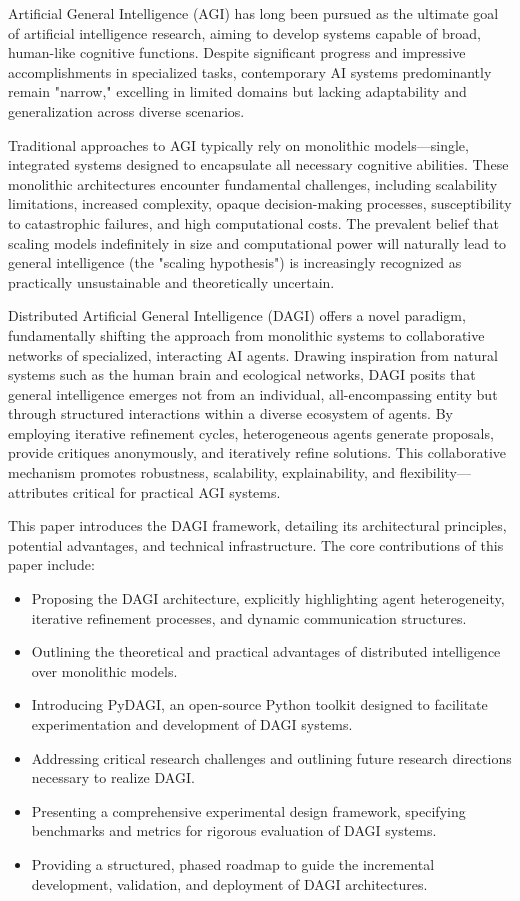\documentclass[12pt]{amsart}
\begin{document}
Artificial General Intelligence (AGI) has long been pursued as the ultimate goal of artificial intelligence research, aiming to develop systems capable of broad, human-like cognitive functions. Despite significant progress and impressive accomplishments in specialized tasks, contemporary AI systems predominantly remain "narrow," excelling in limited domains but lacking adaptability and generalization across diverse scenarios.

Traditional approaches to AGI typically rely on monolithic models—single, integrated systems designed to encapsulate all necessary cognitive abilities. These monolithic architectures encounter fundamental challenges, including scalability limitations, increased complexity, opaque decision-making processes, susceptibility to catastrophic failures, and high computational costs. The prevalent belief that scaling models indefinitely in size and computational power will naturally lead to general intelligence (the "scaling hypothesis") is increasingly recognized as practically unsustainable and theoretically uncertain.

Distributed Artificial General Intelligence (DAGI) offers a novel paradigm, fundamentally shifting the approach from monolithic systems to collaborative networks of specialized, interacting AI agents. Drawing inspiration from natural systems such as the human brain and ecological networks, DAGI posits that general intelligence emerges not from an individual, all-encompassing entity but through structured interactions within a diverse ecosystem of agents. By employing iterative refinement cycles, heterogeneous agents generate proposals, provide critiques anonymously, and iteratively refine solutions. This collaborative mechanism promotes robustness, scalability, explainability, and flexibility—attributes critical for practical AGI systems.

This paper introduces the DAGI framework, detailing its architectural principles, potential advantages, and technical infrastructure. The core contributions of this paper include:
\begin{itemize}
    \item Proposing the DAGI architecture, explicitly highlighting agent heterogeneity, iterative refinement processes, and dynamic communication structures.
    \item Outlining the theoretical and practical advantages of distributed intelligence over monolithic models.
    \item Introducing PyDAGI, an open-source Python toolkit designed to facilitate experimentation and development of DAGI systems.
    \item Addressing critical research challenges and outlining future research directions necessary to realize DAGI.
    \item Presenting a comprehensive experimental design framework, specifying benchmarks and metrics for rigorous evaluation of DAGI systems.
    \item Providing a structured, phased roadmap to guide the incremental development, validation, and deployment of DAGI architectures.
    
\end{itemize}
\end{document}

